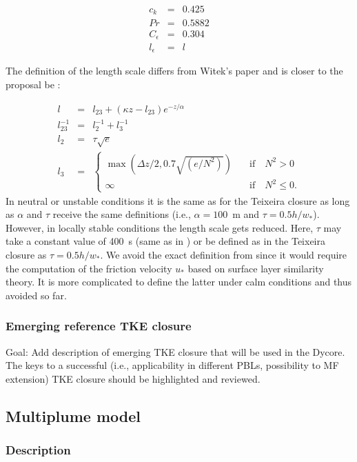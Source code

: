 \documentclass[dvipdfmx,a4paper,10pt]{article}
\begin{document}
\begin{eqnarray}
 c_k&=&0.425\\
 Pr&=&0.5882\\
 C_{\epsilon}&=&0.304\\
 l_{\epsilon}&=&l
\end{eqnarray}

The definition of the length scale differs from Witek's paper and is closer to the proposal be \cite{suselj13}:

\begin{eqnarray}
 l &=&l_{23} + (\kappa z - l_{23}) e^{-z/\alpha} \\
 l_{23}^{-1}&=&l_{2}^{-1} + l_{3}^{-1}\\
 l_{2} &=& \tau \sqrt{e}\\
 l_{3} &=& \left\{ 
 \begin{array}{ll}
  \max(\Delta z/2, 0.7 \sqrt{(e/N^2)})&\quad \mathrm{if}\quad N^2>0\\
  \infty &\quad \mathrm{if}\quad N^2\leq 0.
  \end{array}\right.
\end{eqnarray}
In neutral or unstable conditions it is the same as for the Teixeira closure as long as $\alpha$ and $\tau$ receive the same definitions (i.e., $\alpha=100$~m and $\tau=0.5h/w_*$). However, in locally stable conditions the length scale gets reduced. Here, $\tau$ may take a constant value of 400~s (same as in \cite{suselj13}) or be defined as in the Teixeira closure as $\tau=0.5 h/w_*$. We avoid the exact definition from \cite{witek11} since it would require the computation of the friction velocity $u_*$ based on surface layer similarity theory. It is more complicated to define the latter under calm conditions and thus avoided so far.  

\subsubsection{Emerging reference TKE closure}

{\color{blue} Goal: Add description of emerging TKE closure that will be used in the Dycore. The keys to a successful (i.e., applicability in different PBLs, possibility to MF extension) TKE closure should be highlighted and reviewed.}

\subsection{Multiplume model}

\subsubsection{Description}
\end{document}
